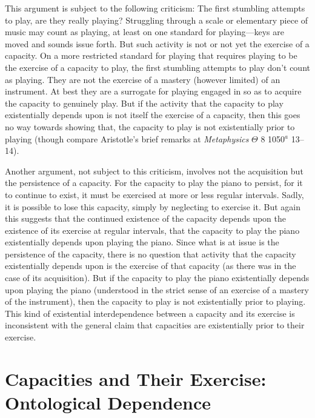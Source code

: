 \documentclass[12pt]{article}
\begin{document}
This argument is subject to the following criticism: The first stumbling attempts to play, are they really playing? Struggling through a scale or elementary piece of music may count as playing, at least on one standard for playing---keys are moved and sounds issue forth. But such activity is not or not yet the exercise of a capacity. On a more restricted standard for playing that requires playing to be the exercise of a capacity to play, the first stumbling attempts to play don't count as playing. They are not the exercise of a mastery (however limited) of an instrument. At best they are a surrogate for playing engaged in so as to acquire the capacity to genuinely play. But if the activity that the capacity to play existentially depends upon is not itself the exercise of a capacity, then this goes no way towards showing that, the capacity to play is not existentially prior to playing (though compare Aristotle's brief remarks at \emph{Metaphysics} \( \Theta \) 8 1050\( ^{a} \) 13--14).

Another argument, not subject to this criticism, involves not the acquisition but the persistence of a capacity. For the capacity to play the piano to persist, for it to continue to exist, it must be exercised at more or less regular intervals. Sadly, it is possible to lose this capacity, simply by neglecting to exercise it. But again this suggests that the continued existence of the capacity depends upon the existence of its exercise at regular intervals, that the capacity to play the piano existentially depends upon playing the piano. Since what is at issue is the persistence of the capacity, there is no question that activity that the capacity existentially depends upon is the exercise of that capacity (as there was in the case of its acquisition). But if the capacity to play the piano existentially depends upon playing the piano (understood in the strict sense of an exercise of a mastery of the instrument), then the capacity to play is not existentially prior to playing. This kind of existential interdependence between a capacity and its exercise is inconsistent with the general claim that capacities are existentially prior to their exercise.


\section{Capacities and Their Exercise: Ontological Dependence} %
\label{sec:capacities_and_their_exercise_ontological_dependence}
\end{document}
